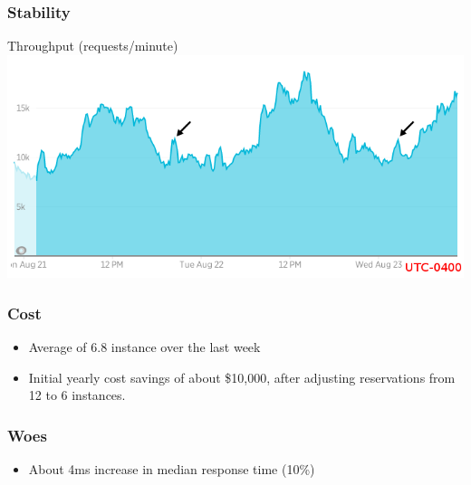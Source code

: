 \documentclass{beamer}
\begin{document}
\begin{frame}
\frametitle{Stability}
\begin{center}
Throughput (requests/minute)
\includegraphics[width=\textwidth]{throughput_arrows.png}
\end{center}
\end{frame}

\begin{frame}
\frametitle{Cost}
\begin{itemize}
\item Average of 6.8 instance over the last week
\item Initial yearly cost savings of about \$10,000, after adjusting reservations from 12 to 6 instances.
\end{itemize}
\end{frame}

\begin{frame}
\frametitle{Woes}
\begin{itemize}
\item About 4ms increase in median response time (10\%)
\end{itemize}
\end{frame}
\end{document}
